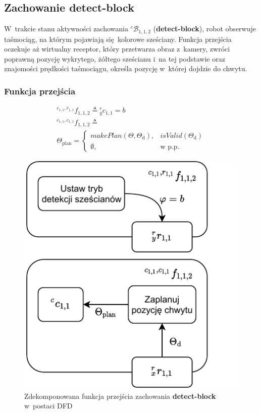 \subsection{Zachowanie detect-block}
\label{subsec:cs-detect-block}
W~trakcie stanu aktywności zachowania ${}^{c}\mathcal{B}_{1,1,2}$ (\textbf{detect-block}), robot obserwuje taśmociąg, na którym pojawiają się kolorowe sześciany. Funkcja przejścia oczekuje aż wirtualny receptor, który przetwarza obraz z~kamery, zwróci poprawną pozycję wykrytego, żółtego sześcianu i~na tej podstawie oraz znajomości prędkości taśmociągu, określa pozycję w~której dojdzie do chwytu.

\subsubsection{Funkcja przejścia}
\begin{equation}
    \begin{gathered}
      {}^{c_{1,1}, r_{1,1}}f_{1,1,2} \triangleq {}^{r}_{y}c_{1,1} = b\\        
      {}^{c_{1,1}, c_{1,1}}f_{1,1,2} \triangleq \\ \Theta_{\mathrm{plan}} =
                   \begin{cases}
       			    makePlan(\Theta, \Theta_{\mathrm{d}}), & isValid(\Theta_{\mathrm{d}})\\
                       \emptyset, & \text{w p.p.}
       		    \end{cases}
    \end{gathered}
\end{equation}

\begin{figure}[H]
    \centering
    \includegraphics[width=\columnwidth]{figures/ISR-cs-fp-detect-block.pdf}
    \caption{Zdekomponowana funkcja przejścia zachowania \textbf{detect-block} w~postaci DFD}
    \label{fig:cs-fp-detect-block}
\end{figure}

